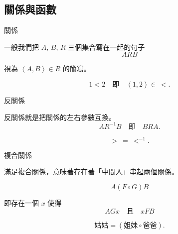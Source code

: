 \documentclass{Slideshow}
\begin{document}
\subsection{關係與函數}
\begin{frame}{關係}
    \begin{definition}
        一般我們把 $A$, $B$, $R$ 三個集合寫在一起的句子
        \[ ARB \]

        視為 $\left\langle A, B \right\rangle \in R$ 的簡寫。
    \end{definition}

    \begin{example}
        \[ 1 < 2 \quad \mbox{即} \quad \left\langle 1, 2 \right\rangle \in\ < .\]
    \end{example}
\end{frame}

\begin{frame}{反關係}
    \begin{definition}
        反關係就是把關係的左右參數互換。
        \[ A R^{-1} B \quad \mbox{即} \quad BRA.\]
    \end{definition}

    \begin{example}
        \[ > \ = \ <^{-1}.\]
    \end{example}
\end{frame}

\begin{frame}{複合關係}
    \begin{definition}
        滿足複合關係，意味著存在著「中間人」串起兩個關係。

        \[ A \left( F \circ G \right) B \]

        即存在一個 $x$ 使得
        \[ AGx \quad \mbox{且} \quad xFB \]
    \end{definition}

    \begin{example}
        \[ \mbox{姑姑} = \left( \mbox{姐妹} \circ \mbox{爸爸} \right). \]
    \end{example}
\end{frame}
\end{document}
